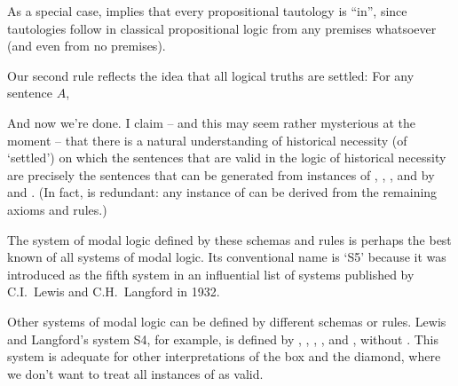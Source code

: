 As a special case,  implies that every propositional tautology is
``in'', since tautologies follow in classical propositional logic from any
premises whatsoever (and even from no premises).

Our second rule reflects the idea that all logical truths are settled: For any
sentence $A$,
%
\begin{principles}
\end{principles}


And now we're done. I claim -- and this may seem rather mysterious at the moment
-- that there is a natural understanding of historical necessity (of `settled')
on which the sentences that are valid in the logic of historical necessity are
precisely the sentences that can be generated from instances of , ,
,  and  by  and . (In fact,  is
redundant: any instance of  can be derived from the remaining axioms and
rules.)

The system of modal logic defined by these schemas and  rules is perhaps the
best known of all systems of modal logic. Its conventional name is `S5' because
it was introduced as the fifth system in an influential list of systems
published by C.I.\ Lewis and C.H.\ Langford in 1932.

Other systems of modal logic can be defined by different schemas or rules.
Lewis and Langford's system S4, for example, is defined by ,
, , ,  and , without
. This system is adequate for other interpretations of the box and the
diamond, where we don't want to treat all instances of  as valid.

